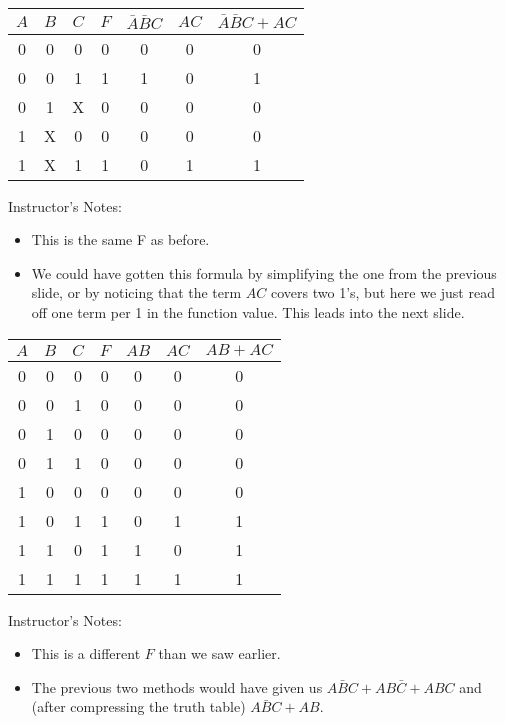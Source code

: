 \begin{frame}[fragile]
\vspace*{.5truein}

\begin{center}
\begin{tabular}{ccc|c|cc|c}
$A$&$B$&$C$ & $F$ & $\bar A \bar B C $& $A C$ & $\bar A \bar B C + A C$ \\\hline
0&0&0 & 0 & 0 & 0 & 0 \\
0&0&1 & 1 & 1 & 0 & 1 \\
0&1&X & 0 & 0 & 0 & 0 \\
1&X&0 & 0 & 0 & 0 & 0 \\
1&X&1 & 1 & 0 & 1 & 1 \\
\end{tabular}
\end{center}

\BNotes\ifnum{}
Instructor's Notes:
\begin{itemize}
\item This is the same F as before. 
\item We could have gotten this formula by
simplifying the one from the previous slide, or by noticing that the
term $AC$ covers two 1's, but here we just read off one term per 1 in
the function value. This leads into the next slide.
\end{itemize}
\fi\ENotes
\end{frame}

\begin{frame}[fragile]

\vspace*{.5truein}

\begin{center}
\begin{tabular}{ccc|c|cc|c}
$A$&$B$&$C$ & $F$ & $A B$ & $A C$& $A B + A C$ \\\hline
0&0&0 & 0 & 0 & 0 & 0 \\
0&0&1 & 0 & 0 & 0 & 0 \\
0&1&0 & 0 & 0 & 0 & 0 \\
0&1&1 & 0 & 0 & 0 & 0 \\
1&0&0 & 0 & 0 & 0 & 0 \\
1&0&1 & 1 & 0 & 1 & 1 \\
1&1&0 & 1 & 1 & 0 & 1 \\
1&1&1 & 1 & 1 & 1 & 1 \\
\end{tabular}
\end{center}

\BNotes\ifnum{}
Instructor's Notes:
\begin{itemize}
\item This is a different $F$ than we saw earlier.
\item The previous two methods would have given us $A\bar B C + A B \bar C +
A B C$ and (after compressing the truth table) $A \bar B C + AB$.
\end{itemize}
\ENotes\fi
\end{frame}

